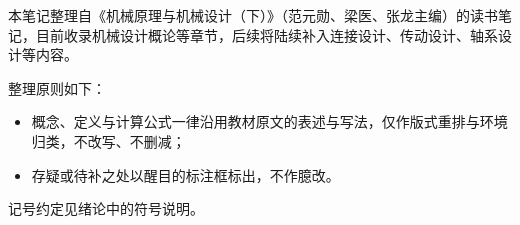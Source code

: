 本笔记整理自《机械原理与机械设计（下）》（范元勋、梁医、张龙主编）的读书笔记，目前收录机械设计概论等章节，后续将陆续补入连接设计、传动设计、轴系设计等内容。

整理原则如下：

\begin{itemize}
	\item 概念、定义与计算公式一律沿用教材原文的表述与写法，仅作版式重排与环境归类，不改写、不删减；
	\item 存疑或待补之处以醒目的标注框标出，不作臆改。
\end{itemize}

记号约定见绪论中的符号说明。
